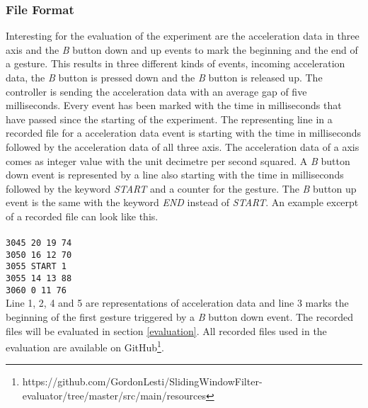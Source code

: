 \subsubsection{File Format}
Interesting for the evaluation of the experiment are the acceleration data in three axis and the \textit{B} button down
and up events to mark the beginning and the end of a gesture. This results in three different kinds of events, incoming
acceleration data, the \textit{B} button is pressed down and the \textit{B} button is released up. The controller is
sending the acceleration data with an average gap of five milliseconds. Every event has been marked with the time
in milliseconds that have passed since the starting of the experiment. The representing line in a recorded file for a
acceleration data event is starting with the time in milliseconds followed by the acceleration data of all three axis.
The acceleration data of a axis comes as integer value with the unit decimetre per second squared. A \textit{B} button
down event is represented by a line also starting with the time in milliseconds followed by the keyword \textit{START}
and a counter for the gesture. The \textit{B} button up event is the same with the keyword \textit{END} instead of
\textit{START}. An example excerpt of a recorded file can look like this.\\\\
\verb!3045 20 19 74!\\
\verb!3050 16 12 70!\\
\verb!3055 START 1!\\
\verb!3055 14 13 88!\\
\verb!3060 0 11 76!\\

Line 1, 2, 4 and 5 are representations of acceleration data and line 3 marks the beginning of the first gesture
triggered by a \textit{B} button down event. The recorded files will be evaluated in section \ref{evaluation}. All
recorded files used in the evaluation are available on
GitHub\footnote{https://github.com/GordonLesti/SlidingWindowFilter-evaluator/tree/master/src/main/resources}.

